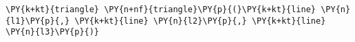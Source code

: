 \begin{Verbatim}[commandchars=\\\{\}]
    \PY{k+kt}{triangle} \PY{n+nf}{triangle}\PY{p}{(}\PY{k+kt}{line} \PY{n}{l1}\PY{p}{,} \PY{k+kt}{line} \PY{n}{l2}\PY{p}{,} \PY{k+kt}{line} \PY{n}{l3}\PY{p}{)}
\end{Verbatim}
